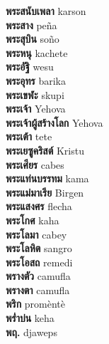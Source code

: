 \textbf{ พระสนับเพลา  } karson \\
\textbf{ พระสาง  } peña \\
\textbf{ พระสุบิน  } soño \\
\textbf{ พระหนุ  } kachete \\
\textbf{ พระอัฐิ  } wesu \\
\textbf{ พระอุทร  } barika \\
\textbf{ พระเขฬะ  } skupi \\
\textbf{ พระเจ้า  } Yehova \\
\textbf{ พระเจ้าผู้สร้างโลก  } Yehova \\
\textbf{ พระเต้า  } tete \\
\textbf{ พระเยซูคริสต์  } Kristu \\
\textbf{ พระเศียร  } cabes \\
\textbf{ พระแท่นบรรทม  } kama \\
\textbf{ พระแม่มาเรีย  } Birgen \\
\textbf{ พระแสงศร  } flecha \\
\textbf{ พระโกศ  } kaha \\
\textbf{ พระโลมา  } cabey \\
\textbf{ พระโลหิต  } sangro \\
\textbf{ พระโอสถ  } remedi \\
\textbf{ พรางตัว  } camufla \\
\textbf{ พรางตา  } camufla \\
\textbf{ พริก  } promèntè \\
\textbf{ พร่ำบ่น  } keha \\
\textbf{ พฤ.  } djaweps \\
